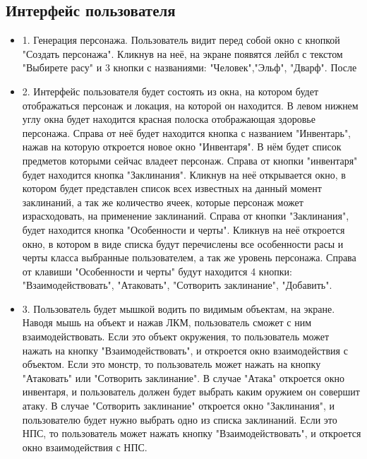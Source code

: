 \subsection{Интерфейс пользователя}
\begin{itemize}
	\item 1. Генерация персонажа. Пользователь видит перед собой окно с кнопкой "Создать персонажа". Кликнув на неё, на экране появятся лейбл с текстом "Выбирете расу" и 3 кнопки с названиями: "Человек","Эльф", "Дварф". После
	\item 2. Интерфейс пользователя будет состоять из окна, на котором будет отображаться персонаж и локация, на которой он находится. В левом нижнем углу окна будет находится красная полоска отображающая здоровье персонажа. Справа от неё будет находится кнопка с названием "Инвентарь", нажав на которую откроется новое окно "Инвентаря". В нём будет список предметов которыми сейчас владеет персонаж. Справа от кнопки "инвентаря" будет находится кнопка "Заклинания". Кликнув на неё открывается окно, в котором будет представлен список всех известных на данный момент заклинаний, а так же количество ячеек, которые персонаж может израсходовать, на применение заклинаний. Справа от кнопки "Заклинания", будет находится кнопка "Особенности и черты". Кликнув на неё откроется окно, в котором в виде списка будут перечислены все особенности расы и черты класса выбранные пользователем, а так же уровень персонажа. Справа от клавиши "Особенности и черты" будут находится 4 кнопки: "Взаимодействовать", "Атаковать", "Сотворить заклинание", "Добавить".
	\item 3. Пользователь будет мышкой водить по видимым объектам, на экране. Наводя мышь на объект и нажав ЛКМ, пользователь сможет с ним взаимодействовать. Если это объект окружения, то пользователь может нажать на кнопку "Взаимодействовать", и откроется окно взаимодействия с объектом. Если это монстр, то  пользователь может нажать на кнопку "Атаковать" или "Сотворить заклинание". В случае "Атака" откроется окно инвентаря, и пользователь должен будет выбрать каким оружием он совершит атаку. В случае "Сотворить заклинание" откроется окно "Заклинания", и пользователю будет нужно выбрать одно из списка заклинаний. Если это НПС, то пользователь может нажать кнопку "Взаимодействовать", и откроется окно взаимодействия с НПС.
\end{itemize}
